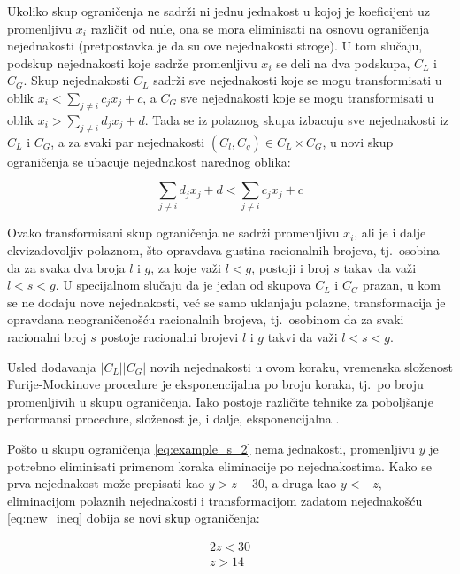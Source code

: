 \documentclass[a4paper,10pt]{article}
\begin{document}
Ukoliko skup ograničenja ne sadrži ni jednu jednakost u kojoj je koeficijent uz promenljivu $x_i$ različit od nule, ona se mora eliminisati na osnovu ograničenja nejednakosti (pretpostavka je da su ove nejednakosti stroge). U tom slučaju, podskup nejednakosti koje sadrže promenljivu $x_i$ se deli na dva podskupa, $C_L$ i $C_G$. Skup nejednakosti $C_L$ sadrži sve nejednakosti koje se mogu transformisati u oblik $x_i < \sum_{j \ne i}{c_jx_j + c}$, a $C_G$ sve nejednakosti koje se mogu transformisati u oblik $x_i > \sum_{j \ne i}{d_jx_j + d}$. Tada se iz polaznog skupa izbacuju sve nejednakosti iz $C_L$ i $C_G$, a za svaki par nejednakosti $(C_l, C_g) \in C_L \times C_G$, u novi skup ograničenja se ubacuje nejednakost narednog oblika:

\begin{equation}
    \label{eq:new_ineq}
    \sum_{j \ne i}{d_jx_j + d} < \sum_{j \ne i}{c_jx_j + c}
\end{equation}

Ovako transformisani skup ograničenja ne sadrži promenljivu $x_i$, ali je i dalje ekvizadovoljiv polaznom, što opravdava gustina racionalnih brojeva, tj.~osobina da za svaka dva broja $l$ i $g$, za koje važi $l < g$, postoji i broj $s$ takav da važi $l < s < g$. U specijalnom slučaju da je jedan od skupova $C_L$ i $C_G$ prazan, u kom se ne dodaju nove nejednakosti, već se samo uklanjaju polazne, transformacija je opravdana neograničenošću racionalnih brojeva, tj.~osobinom da za svaki racionalni broj $s$ postoje racionalni brojevi $l$ i $g$ takvi da važi $l < s < g$.

Usled dodavanja $|C_L||C_G|$ novih nejednakosti u ovom koraku, vremenska složenost Furije-Mockinove procedure je eksponencijalna po broju koraka, tj.~po broju promenljivih u skupu ograničenja. Iako postoje različite tehnike za poboljšanje performansi procedure, složenost je, i dalje, eksponencijalna \cite{complexity-estimates-fourier-motzkin}.

Pošto u skupu ograničenja \eqref{eq:example_s_2} nema jednakosti, promenljivu $y$ je potrebno eliminisati primenom koraka eliminacije po nejednakostima. Kako se prva nejednakost može prepisati kao $y > z - 30$, a druga kao $y < -z$, eliminacijom polaznih nejednakosti i transformacijom zadatom nejednakošću \eqref{eq:new_ineq} dobija se novi skup ograničenja:

\begin{equation}
\begin{gathered}
    \label{eq:example_s_3}
    2z < 30 \\
    z > 14
\end{gathered}
\end{equation}
\end{document}
